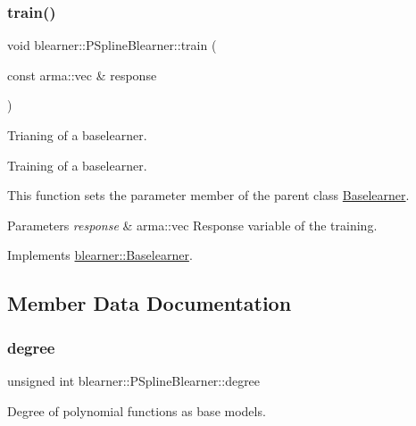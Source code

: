 \subsubsection{\texorpdfstring{train()}{train()}}
{\footnotesize\ttfamily void blearner\+::\+P\+Spline\+Blearner\+::train (\begin{DoxyParamCaption}\item[{const arma\+::vec \&}]{response }\end{DoxyParamCaption})\hspace{0.3cm}{\ttfamily [virtual]}}



Trianing of a baselearner. 

Training of a baselearner.

This function sets the {\ttfamily parameter} member of the parent class {\ttfamily \hyperlink{classblearner_1_1_baselearner}{Baselearner}}.


\begin{DoxyParams}{Parameters}
{\em response} & {\ttfamily arma\+::vec} Response variable of the training. \\
\hline
\end{DoxyParams}


Implements \hyperlink{classblearner_1_1_baselearner_a40e03ad070b9a03aae706d9ee8094b80}{blearner\+::\+Baselearner}.



\subsection{Member Data Documentation}
\mbox{\label{classblearner_1_1_p_spline_blearner_a0f01c6609befd8af4d5a44f22293ba55}} 
\subsubsection{\texorpdfstring{degree}{degree}}
{\footnotesize\ttfamily unsigned int blearner\+::\+P\+Spline\+Blearner\+::degree\hspace{0.3cm}{\ttfamily [private]}}



Degree of polynomial functions as base models. 

\mbox{\label{classblearner_1_1_p_spline_blearner_a93ea3a6c970521e14822d78f0f687ad4}} 
